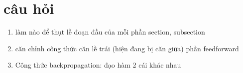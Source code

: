 \documentclass[12pt,a4paper]{report}
\begin{document}
\tableofcontents
\newpage





\section{câu hỏi}
\begin{enumerate}
\item làm nào để thụt lề đoạn đầu của mỗi phần section, subsection
\item căn chỉnh công thức căn lề trái (hiện đang bị căn giữa) phần feedforward
\item Công thức backpropagation: đạo hàm 2 cái khác nhau
\end{enumerate}
\end{document}
